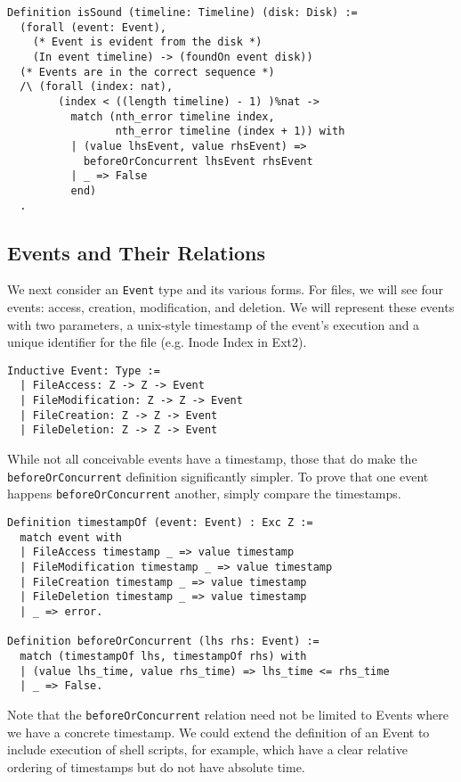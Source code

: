 \documentclass[nocopyrightspace]{sigplanconf}
\begin{document}
\begin{lstlisting}
Definition isSound (timeline: Timeline) (disk: Disk) :=
  (forall (event: Event),
    (* Event is evident from the disk *)
    (In event timeline) -> (foundOn event disk))
  (* Events are in the correct sequence *)
  /\ (forall (index: nat),
        (index < ((length timeline) - 1) )%nat ->
          match (nth_error timeline index,
                 nth_error timeline (index + 1)) with
          | (value lhsEvent, value rhsEvent) => 
            beforeOrConcurrent lhsEvent rhsEvent
          | _ => False
          end)
  .
\end{lstlisting}

\subsection{Events and Their Relations}

We next consider an {\tt Event} type and its various forms. For files, we will
see four events: access, creation, modification, and deletion. We will
represent these events with two parameters, a unix-style timestamp of the
event's execution and a unique identifier for the file (e.g. Inode Index in
Ext2).

\begin{lstlisting}
Inductive Event: Type :=
  | FileAccess: Z -> Z -> Event
  | FileModification: Z -> Z -> Event
  | FileCreation: Z -> Z -> Event
  | FileDeletion: Z -> Z -> Event
\end{lstlisting}

While not all conceivable events have a timestamp, those that do make the {\tt
beforeOrConcurrent} definition significantly simpler. To prove that one event
happens {\tt beforeOrConcurrent} another, simply compare the timestamps.

\begin{lstlisting}
Definition timestampOf (event: Event) : Exc Z :=
  match event with
  | FileAccess timestamp _ => value timestamp
  | FileModification timestamp _ => value timestamp
  | FileCreation timestamp _ => value timestamp
  | FileDeletion timestamp _ => value timestamp
  | _ => error.

Definition beforeOrConcurrent (lhs rhs: Event) :=
  match (timestampOf lhs, timestampOf rhs) with
  | (value lhs_time, value rhs_time) => lhs_time <= rhs_time
  | _ => False.
\end{lstlisting}

Note that the {\tt beforeOrConcurrent} relation need not be limited to Events
where we have a concrete timestamp. We could extend the definition of an Event
to include execution of shell scripts, for example, which have a clear
relative ordering of timestamps but do not have absolute time.
\end{document}
